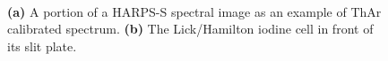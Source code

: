 \begin{figure}
\centering
{}\
\caption{{\bf (a)} A portion of a HARPS-S spectral image as an
  example of ThAr calibrated spectrum. {\bf (b)} The Lick/Hamilton
  iodine cell in front of its slit plate.
\label{intro:fig:thar-iod}}
\end{figure}

